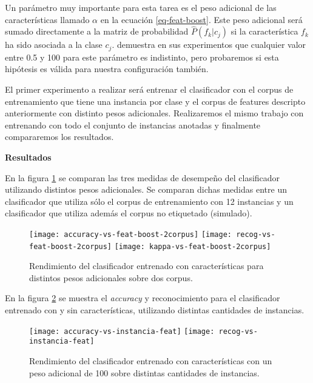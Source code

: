 Un parámetro muy importante para esta tarea es el peso adicional de las características llamado $\alpha$ en la ecuación \ref{eq-feat-boost}. Este peso adicional será sumado directamente a la matriz de probabilidad $\hat{P}(f_k|c_j)$ si la característica $f_k$ ha sido asociada a la clase $c_j$. \citet{dualist} demuestra en sus experimentos que cualquier valor entre 0.5 y 100 para este parámetro es indistinto, pero probaremos si esta hipótesis es válida para nuestra configuración también.

El primer experimento a realizar será entrenar el clasificador con el corpus de entrenamiento que tiene una instancia por clase y el corpus de features descripto anteriormente con distinto pesos adicionales. Realizaremos el mismo trabajo con entrenando con todo el conjunto de instancias anotadas y finalmente compararemos los resultados.

\vspace{3 mm}

\textbf{Resultados}

En la figura \ref{comp-feature-boost} se comparan las tres medidas de desempeño del clasificador utilizando distintos pesos adicionales. Se comparan dichas medidas entre un clasificador que utiliza sólo el corpus de entrenamiento con 12 instancias y un clasificador que utiliza además el corpus no etiquetado (simulado).

\begin{figure}[h!]\label{comp-feature-boost}
\centering
\texttt{[image: accuracy-vs-feat-boost-2corpus]}
\texttt{[image: recog-vs-feat-boost-2corpus]}
\texttt{[image: kappa-vs-feat-boost-2corpus]}
\caption{Rendimiento del clasificador entrenado con características para distintos pesos adicionales sobre dos corpus.}
\end{figure}

En la figura \ref{comp-feat-tr-inst} se muestra el \textit{accuracy} y reconocimiento para el clasificador entrenado con y sin características, utilizando distintas cantidades de instancias.

\begin{figure}[h!]\label{comp-feat-tr-inst}
\centering
\texttt{[image: accuracy-vs-instancia-feat]}
\texttt{[image: recog-vs-instancia-feat]}
\caption{Rendimiento del clasificador entrenado con características con un peso adicional de 100 sobre distintas cantidades de instancias.}
\end{figure}
\vspace{3 mm}

